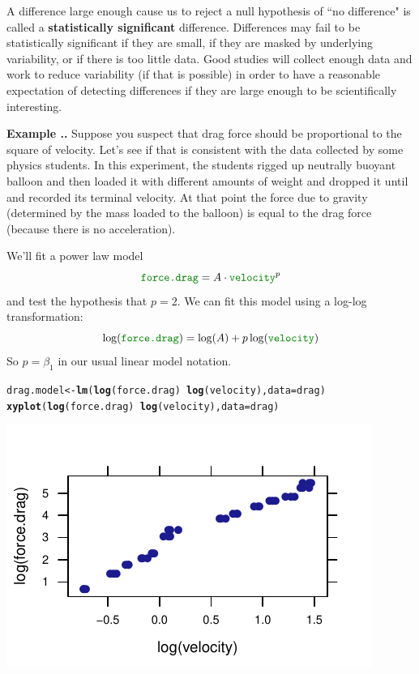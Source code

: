 \documentclass[twoside]{book}
\makeatletter
\def\maxwidth{ %
  \ifdim\Gin@nat@width>\linewidth
    \linewidth
  \else
    \Gin@nat@width
  \fi
}
\newcommand{\hlopt}[1]{\textcolor[rgb]{0,0,0}{#1}}%
\newcommand{\hlstd}[1]{\textcolor[rgb]{0.345,0.345,0.345}{#1}}%
\newcommand{\hlkwb}[1]{\textcolor[rgb]{0.69,0.353,0.396}{#1}}%
\newcommand{\hlkwc}[1]{\textcolor[rgb]{0.333,0.667,0.333}{#1}}%
\newcommand{\hlkwd}[1]{\textcolor[rgb]{0.737,0.353,0.396}{\textbf{#1}}}%
\newenvironment{kframe}{%
 \def\at@end@of@kframe{}%
 \ifinner\ifhmode%
  \def\at@end@of@kframe{\end{minipage}}%
  \begin{minipage}{\columnwidth}%
 \fi\fi%
 \def\FrameCommand##1{\hskip\@totalleftmargin \hskip-\fboxsep
 \colorbox{shadecolor}{##1}\hskip-\fboxsep
     \hskip-\linewidth \hskip-\@totalleftmargin \hskip\columnwidth}%
 \MakeFramed {\advance\hsize-\width
   \@totalleftmargin\z@ \linewidth\hsize
   \@setminipage}}%
 {\par\unskip\endMakeFramed%
 \at@end@of@kframe}
\newenvironment{knitrout}{}{} %
\newcommand{\variable}[1]{{\color{green!50!black}\texttt{#1}}}
\def\term#1{\textbf{#1}}
\newcounter{example}[section]
\newenvironment{example}%
{\refstepcounter{example}%
\textbf{Example \thesection.\arabic{example}. }}%
{}
\makeatother
\begin{document}
A difference large enough cause us to reject a null hypothesis of ``no difference" 
is called a \term{statistically significant} difference.  Differences may fail to be statistically
significant if they are small, if they are masked by underlying variability, or if there is too 
little data.  Good studies will collect enough data and work to reduce variability (if that is possible)
in order to have a reasonable expectation of detecting differences if they are large enough to 
be scientifically interesting.

\begin{example}
Suppose you suspect that drag force should be proportional to the square of velocity.  Let's see
if that is consistent with the data collected by some physics students.  
In this experiment, the students rigged up neutrally buoyant balloon and then loaded it 
with different amounts of weight and dropped it until and recorded its terminal velocity.
At that point the force due to gravity (determined by the mass loaded to the balloon) 
is equal to the drag force (because there is no acceleration).

We'll fit a power law model
\[
\variable{force.drag} = A \cdot \variable{velocity}^p
\]
and test the hypothesis that $p=2$.  We can fit this model using a log-log transformation:
\[
\log(\variable{force.drag}) = \log(A)  +  p \log( \variable{velocity} )
\]
So $p=\beta_1$ in our usual linear model notation.

\begin{knitrout}
\color{fgcolor}\begin{kframe}
\begin{alltt}
\hlstd{drag.model} \hlkwb{<-} \hlkwd{lm}\hlstd{(}\hlkwd{log}\hlstd{(force.drag)} \hlopt{~} \hlkwd{log}\hlstd{(velocity),} \hlkwc{data} \hlstd{= drag)}
\hlkwd{xyplot}\hlstd{(}\hlkwd{log}\hlstd{(force.drag)} \hlopt{~} \hlkwd{log}\hlstd{(velocity),} \hlkwc{data} \hlstd{= drag)}
\end{alltt}
\end{kframe}

{\centering \includegraphics[width=\maxwidth]{figures/fig-drag-again-1} 

}
\end{knitrout}
\end{example}
\end{document}
